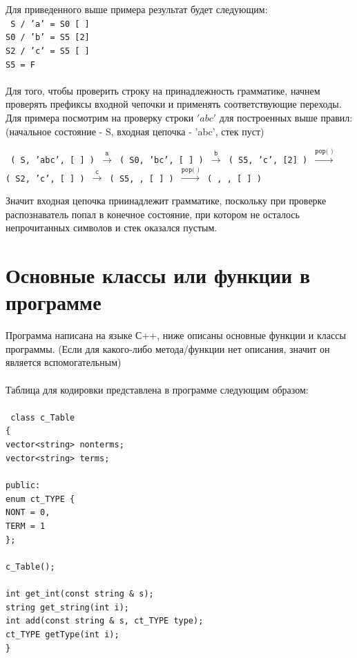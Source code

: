 \documentclass[12pt]{article}
\newcommand\tab[1][1cm]{\hspace*{#1}}
\begin{document}
Для приведенного выше примера результат будет следующим:\\  
\texttt{
\tab S / 'a' = S0 [ ]\\
\tab S0 / 'b' = S5 [2]\\
\tab S2 / 'c' = S5 [ ]\\
\tab S5 = F\\
}
\\

Для того, чтобы проверить строку на принадлежность грамматике, начнем проверять префиксы входной чепочки и применять соответствующие переходы. Для примера посмотрим на проверку строки $'abc'$ для построенных выше правил: \\
(начальное состояние - S, входная цепочка - 'abc', стек пуст)

\texttt{
( S, 'abc', [ ] ) $\xrightarrow{\texttt{a}}$ ( S0, 'bc', [ ] ) $\xrightarrow{\texttt{b}}$ ( S5, 'c', [2] ) $\xrightarrow{\texttt{pop( )}}$\\\tab ( S2, 'c', [ ] ) $\xrightarrow{\texttt{c}}$ ( S5, , [ ] ) $\xrightarrow{\texttt{pop( )}}$ ( , , [ ] )
}

Значит входная цепочка приинадлежит грамматике, поскольку при проверке распознаватель попал в конечное состояние, при котором не осталось непрочитанных символов и стек оказался пустым.
 
\section{Основные классы или функции в программе}
Программа написана на языке С++, ниже описаны основные функции и классы программы. (Если для какого-либо метода/функции нет описания, значит он является вспомогательным)\\
\\
Таблица для кодировки представлена в программе следующим образом:\\\\
\texttt{
class c\_Table\\
\{\\
\tab	vector<string> nonterms;\\
\tab	vector<string> terms;\\\\
public:\\
\tab	enum ct\_TYPE \{\\
\tab\tab		NONT = 0,\\
\tab\tab		TERM = 1\\
\tab	\};\\\\
\tab	c\_Table();\\\\
\tab	int get\_int(const string \& s);\\
\tab	string get\_string(int i);\\
\tab	int add(const string \& s, ct\_TYPE type);\\
\tab	ct\_TYPE getType(int i);\\\}
}
\end{document}
